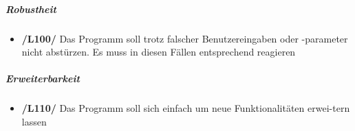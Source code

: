 \subparagraph{Robustheit}

\begin{itemize}
\item{\textbf{/L100/} Das Programm soll trotz falscher Benutzereingaben oder -parameter nicht abstürzen. Es muss in diesen Fällen entsprechend reagieren}

\end{itemize}

\subparagraph{Erweiterbarkeit}

\begin{itemize}
\item{\textbf{/L110/} Das Programm soll sich einfach um neue Funktionalitäten erwei-tern lassen}
\end{itemize}

 
